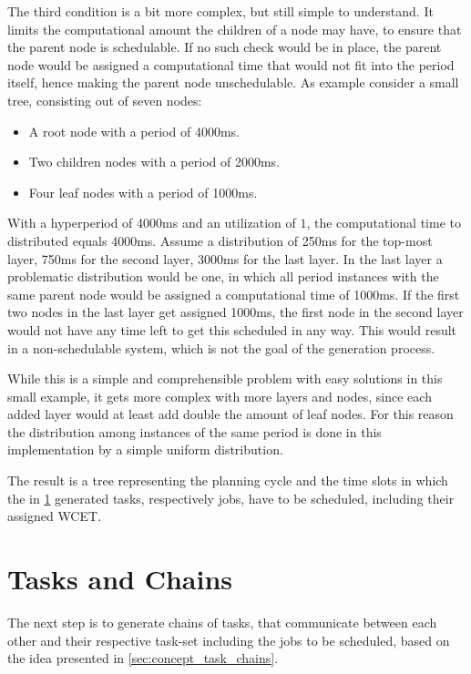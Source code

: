 The third condition is a bit more complex, but still simple to understand.
It limits the computational amount the children of a node may have, to ensure that the parent node is schedulable.
If no such check would be in place, the parent node would be assigned a computational time that would not fit into the period itself, hence making the parent node unschedulable.
As example consider a small tree, consisting out of seven nodes:
\begin{itemize}
	\item A root node with a period of 4000ms.
	\item Two children nodes with a period of 2000ms.
	\item Four leaf nodes with a period of 1000ms.
\end{itemize}
With a hyperperiod of 4000ms and an utilization of $1$, the computational time to distributed equals 4000ms.
Assume a distribution of 250ms for the top-most layer, 750ms for the second layer, 3000ms for the last layer.
In the last layer a problematic distribution would be one, in which all period instances with the same parent node would be assigned a computational time of 1000ms.
If the first two nodes in the last layer get assigned 1000ms, the first node in the second layer would not have any time left to get this scheduled in any way.
This would result in a non-schedulable system, which is not the goal of the generation process.

While this is a simple and comprehensible problem with easy solutions in this small example, it gets more complex with more layers and nodes, since each added layer would at least add double the amount of leaf nodes.
For this reason the distribution among instances of the same period is done in this implementation by a simple uniform distribution.

The result is a tree representing the planning cycle and the time slots in which the in \cref{subsec:impl:tasks-and-chains} generated tasks, respectively jobs, have to be scheduled, including their assigned \ac{WCET}.

\section{Tasks and Chains}\label{subsec:impl:tasks-and-chains}
The next step is to generate chains of tasks, that communicate between each other and their respective task-set including the jobs to be scheduled, based on the idea presented in \cref{sec:concept_task_chains}.

